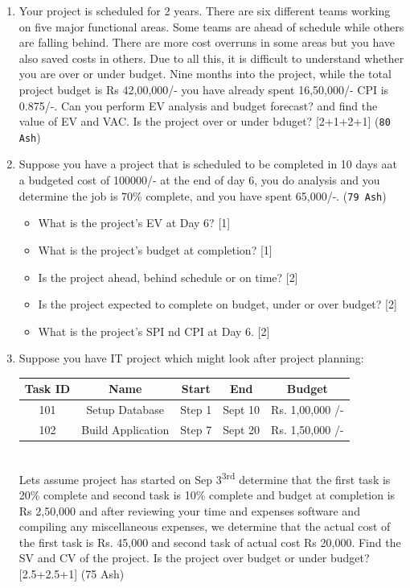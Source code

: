 \documentclass[12pt]{article}
\newcommand{\super}[1]{\textsuperscript{#1}}
\begin{document}
\begin{enumerate}
      \item Your project is scheduled for 2 years. There are six different teams working on five major functional areas. Some teams are ahead of schedule while others are falling behind. There are more cost overruns in some areas but you have also saved costs in others. Due to all this, it is difficult to understand whether you are over or under budget. Nine months into the project, while the total project budget is Rs 42,00,000/- you have already spent 16,50,000/- CPI is 0.875/-. Can you perform EV analysis and budget forecast? and find the value of EV and VAC. Is the project over or under bduget? \hfill [2+1+2+1] (\texttt{80 Ash})

      \item Suppose you have a project that is scheduled to be completed in 10 days aat a budgeted cost of 100000/- at the end of day 6, you do analysis and you determine the job is 70\% complete, and you have spent 65,000/-. (\texttt{79 Ash})
        \begin{itemize}
          \item What is the project's EV at Day 6? \hfill [1]
          \item What is the project's budget at completion? \hfill [1]
          \item Is the project ahead, behind schedule or on time? \hfill [2]
          \item Is the project expected to complete on budget, under or over budget? \hfill [2]
          \item What is the project's SPI nd CPI at Day 6. \hfill [2]
        \end{itemize}

      \item Suppose you have IT project which might look after project planning:\\
        \begin{tabular}{|c|c|c|c|c|}
          \hline
          Task ID & Name & Start & End & Budget \\ \hline
          101 & Setup Database & Step 1 & Sept 10 & Rs. 1,00,000 /- \\ \hline
          102 & Build Application & Step 7 & Sept 20 & Rs. 1,50,000 /- \\ \hline
        \end{tabular}\\
        Lets assume project has started on Sep 3\super{3rd} determine that the first task is 20\% complete and second task is 10\% complete and budget at completion is Rs 2,50,000 and after reviewing your time and expenses software and compiling any miscellaneous expenses, we determine that the actual cost of the first task is Rs. 45,000 and second task of actual cost Rs 20,000. Find the SV and CV of the project. Is the project over budget or under budget? \hfill [2.5+2.5+1] (75 Ash)


\end{enumerate}
\end{document}
